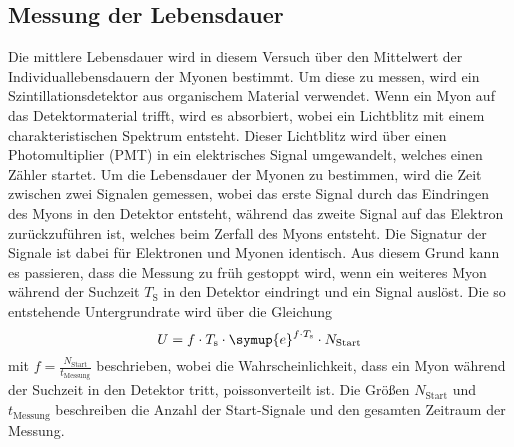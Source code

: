 \subsection{Messung der Lebensdauer}

Die mittlere Lebensdauer wird in diesem Versuch über den Mittelwert der Individuallebensdauern der Myonen bestimmt.
Um diese zu messen,
wird ein Szintillationsdetektor aus organischem Material verwendet.
Wenn ein Myon auf das Detektormaterial trifft,
wird es absorbiert,
wobei ein Lichtblitz mit einem charakteristischen Spektrum entsteht.
Dieser Lichtblitz wird über einen Photomultiplier (PMT) in ein elektrisches Signal umgewandelt,
welches einen Zähler startet.
Um die Lebensdauer der Myonen zu bestimmen, 
wird die Zeit zwischen zwei Signalen gemessen,
wobei das erste Signal durch das Eindringen des Myons in den Detektor entsteht,
während das zweite Signal auf das Elektron zurückzuführen ist,
welches beim Zerfall des Myons entsteht.
Die Signatur der Signale ist dabei für Elektronen und Myonen identisch.
Aus diesem Grund kann es passieren,
dass die Messung zu früh gestoppt wird,
wenn ein weiteres Myon während der Suchzeit $T_\text{S}$ in den Detektor eindringt und ein Signal auslöst. 
Die so entstehende Untergrundrate wird über die Gleichung
\begin{equation}
    U = f \cdot T_\text{s} \cdot \symup{e}^{f \cdot T_\text{s}} \cdot N_\text{Start} 
\end{equation}
mit $f = \frac{N_\text{Start}}{t_\text{Messung}}$ beschrieben, 
wobei die Wahrscheinlichkeit, 
dass ein Myon während der Suchzeit in den Detektor tritt,
poissonverteilt ist.
Die Größen $N_\text{Start}$ und $t_\text{Messung}$ beschreiben die Anzahl der Start-Signale und den gesamten Zeitraum der Messung.

